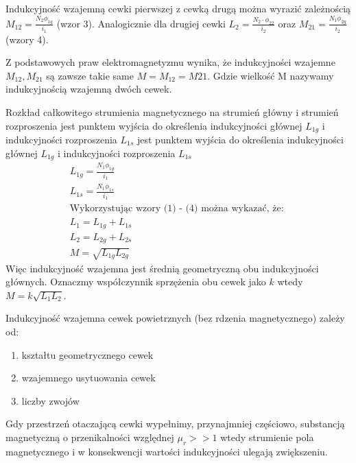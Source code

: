 \documentclass[a4paper,12pt]{scrbook} %
\begin{document}
\noindent
Indukcyjność wzajemną cewki pierwszej z cewką drugą można wyrazić zależnością $M_{12} = \frac{N_2 \phi_{1g}}{i_1}$ (wzor 3). Analogicznie dla drugiej cewki $L_2 = \frac{N_2 \cdot \phi_{22}}{i_2}$ oraz $M_{21} = \frac{N_1 \phi_{2g}}{i_2}$ (wzory 4).

Z podstawowych praw elektromagnetyzmu wynika, że indukcyjności wzajemne $M_{12}, M_{21}$ są zawsze takie same $M = M_{12} = M{21}$. Gdzie wielkość M nazywamy indukcyjnością wzajemną dwóch cewek.

Rozkład całkowitego strumienia magnetycznego na strumień główny i strumień rozproszenia jest punktem wyjścia do określenia indukcyjności głównej $L_{1g}$ i indukcyjności rozproszenia $L_{1s}$ jest punktem wyjścia do określenia indukcyjności głównej $L_{1g}$ i indukcyjności rozproszenia $L_{1s}$\\
\begin{equation}
\begin{gathered}
L_{1g} = \frac{N_1 \phi_{1g}}{i_1}\\
L_{1s} = \frac{N_1 \phi_{1s}}{i_1}\\
\text{Wykorzystując wzory (1) - (4) można wykazać, że: } \\
L_1 = L_{1g} + L_{1s} \\
L_2 = L_{2g} + L_{2s} \\
M = \sqrt{L_{1g}L_{2g}}
\end{gathered}
\end{equation}
Więc indukcyjność wzajemna jest średnią geometryczną obu indukcyjności głównych. Oznaczmy współczynnik sprzężenia obu cewek jako $k$ wtedy $M = k \sqrt{L_1 L_2}$.

Indukcyjność wzajemna cewek powietrznych (bez rdzenia magnetycznego) zależy od:
\begin{enumerate}
\item{kształtu geometrycznego cewek}
\item{wzajemnego usytuowania cewek}
\item{liczby zwojów}
\end{enumerate}

Gdy przestrzeń otaczającą cewki wypełnimy, przynajmniej częściowo, substancją magnetyczną o przenikalności względnej $\mu_r >> 1$ wtedy strumienie pola magnetycznego i w konsekwencji wartości indukcyjności ulegają zwiększeniu.
\end{document}
